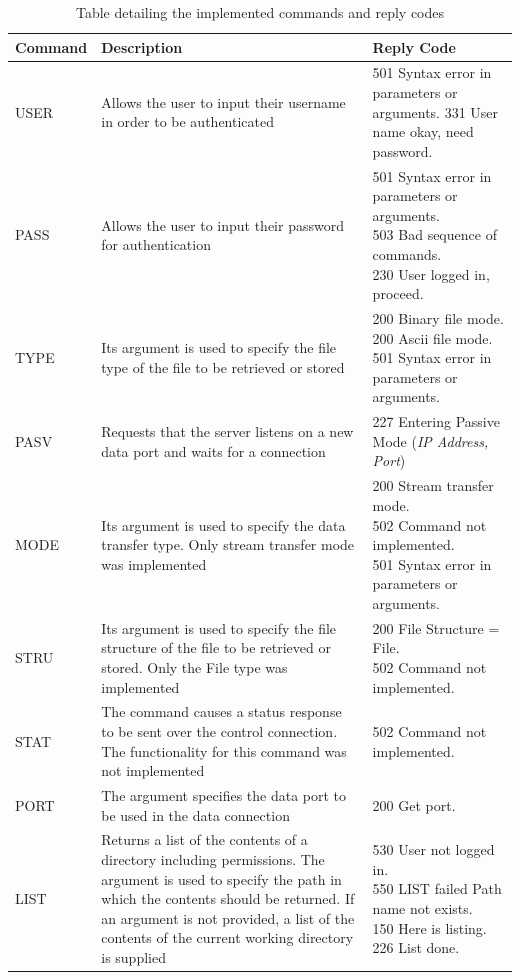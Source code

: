 \documentclass[10pt,twocolumn]{witseiepaper}
\begin{document}
\begin{appendix}
\begin{longtable}{|p{2cm}|p{7cm}|p{7cm}|}
		\caption{Table detailing the implemented commands and reply codes}
		\label{tab:commands} \\
	\hline 
	Command & Description & Reply Code \\ 
	\hline 
	\hline
USER	& Allows the user to input their username in order to be authenticated  &  501 Syntax error in parameters or arguments. 331 User name okay, need password. \\ 
	\hline 
PASS	& Allows the user to input their password for authentication & \makecell[l]{501 Syntax error in parameters or arguments.\\503 Bad sequence of commands. \\230 User logged in, proceed.} \\ 
	\hline 
TYPE	& Its argument is used to specify the file type of the file to be retrieved or stored & \makecell[l]{200 Binary file mode.\\200 Ascii file mode. \\501 Syntax error in parameters or arguments.}\\ 
	\hline 
PASV	& Requests that the server listens on a new data port and waits for a connection & 227 Entering Passive Mode (\textit{IP Address, Port}) \\ 
	\hline 
MODE	& Its argument is used to specify the data transfer type. Only stream transfer mode was implemented & \makecell[l]{200 Stream transfer mode. \\502 Command not implemented. \\501 Syntax error in parameters or arguments.} \\ 
	\hline 
STRU	& Its argument is used to specify the file structure of the file to be retrieved or stored. Only the File type was implemented  & \makecell[l]{200 File Structure = File. \\502 Command not implemented.} \\ 
	\hline 
STAT	& The command causes a status response to be sent over the control connection. The functionality for this command was not implemented & 502 Command not implemented. \\ 
	\hline 
PORT	& The argument specifies the data port to be used in the data connection & 200 Get port. \\ 
	\hline 
LIST & Returns a list of the contents of a directory including permissions. The argument is used to specify the path in which the contents should be returned. If an argument is not provided, a list of the contents of the current working directory is supplied &\makecell[l]{530 User not logged in. \\550 LIST failed Path name not exists. \\150 Here is listing. \\226 List done.}\\ 

\end{longtable}
\end{appendix}
\end{document}
